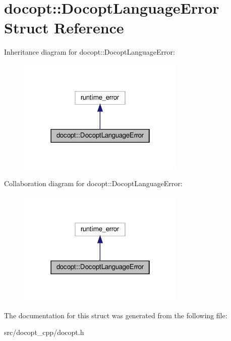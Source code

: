 \hypertarget{structdocopt_1_1DocoptLanguageError}{}\section{docopt\+:\+:Docopt\+Language\+Error Struct Reference}
\label{structdocopt_1_1DocoptLanguageError}


Inheritance diagram for docopt\+:\+:Docopt\+Language\+Error\+:
\nopagebreak
\begin{figure}[H]
\begin{center}
\leavevmode
\includegraphics[width=226pt]{structdocopt_1_1DocoptLanguageError__inherit__graph}
\end{center}
\end{figure}


Collaboration diagram for docopt\+:\+:Docopt\+Language\+Error\+:
\nopagebreak
\begin{figure}[H]
\begin{center}
\leavevmode
\includegraphics[width=226pt]{structdocopt_1_1DocoptLanguageError__coll__graph}
\end{center}
\end{figure}


The documentation for this struct was generated from the following file\+:\begin{DoxyCompactItemize}
\item 
src/docopt\+\_\+cpp/docopt.\+h\end{DoxyCompactItemize}
